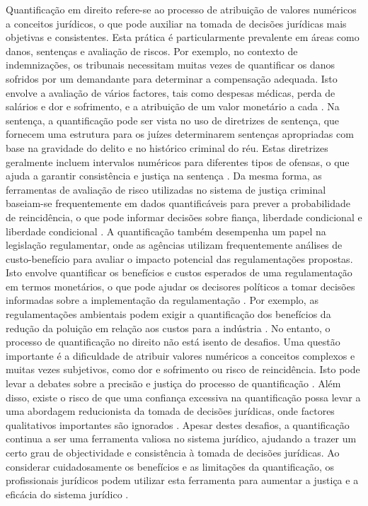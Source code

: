 Quantificação em direito refere-se ao processo de atribuição de valores numéricos a conceitos jurídicos, o que pode auxiliar na tomada de decisões jurídicas mais objetivas e consistentes. Esta prática é particularmente prevalente em áreas como danos, sentenças e avaliação de riscos. Por exemplo, no contexto de indemnizações, os tribunais necessitam muitas vezes de quantificar os danos sofridos por um demandante para determinar a compensação adequada. Isto envolve a avaliação de vários factores, tais como despesas médicas, perda de salários e dor e sofrimento, e a atribuição de um valor monetário a cada \cite{damages_quantification}. Na sentença, a quantificação pode ser vista no uso de diretrizes de sentença, que fornecem uma estrutura para os juízes determinarem sentenças apropriadas com base na gravidade do delito e no histórico criminal do réu. Estas diretrizes geralmente incluem intervalos numéricos para diferentes tipos de ofensas, o que ajuda a garantir consistência e justiça na sentença \cite{sentencing_guidelines}. Da mesma forma, as ferramentas de avaliação de risco utilizadas no sistema de justiça criminal baseiam-se frequentemente em dados quantificáveis para prever a probabilidade de reincidência, o que pode informar decisões sobre fiança, liberdade condicional e liberdade condicional \cite{risk_assessment}. A quantificação também desempenha um papel na legislação regulamentar, onde as agências utilizam frequentemente análises de custo-benefício para avaliar o impacto potencial das regulamentações propostas. Isto envolve quantificar os benefícios e custos esperados de uma regulamentação em termos monetários, o que pode ajudar os decisores políticos a tomar decisões informadas sobre a implementação da regulamentação \cite{cost_benefit_análise}. Por exemplo, as regulamentações ambientais podem exigir a quantificação dos benefícios da redução da poluição em relação aos custos para a indústria \cite{regulação_ambiental}. No entanto, o processo de quantificação no direito não está isento de desafios. Uma questão importante é a dificuldade de atribuir valores numéricos a conceitos complexos e muitas vezes subjetivos, como dor e sofrimento ou risco de reincidência. Isto pode levar a debates sobre a precisão e justiça do processo de quantificação \cite{quantification_challenges}. Além disso, existe o risco de que uma confiança excessiva na quantificação possa levar a uma abordagem reducionista da tomada de decisões jurídicas, onde factores qualitativos importantes são ignorados \cite{reductionist_approach}. Apesar destes desafios, a quantificação continua a ser uma ferramenta valiosa no sistema jurídico, ajudando a trazer um certo grau de objectividade e consistência à tomada de decisões jurídicas. Ao considerar cuidadosamente os benefícios e as limitações da quantificação, os profissionais jurídicos podem utilizar esta ferramenta para aumentar a justiça e a eficácia do sistema jurídico \cite{quantification_value}. 

